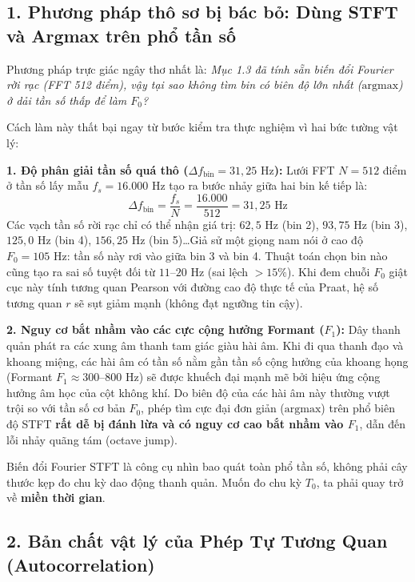 \documentclass[11pt,a4paper]{article}
\begin{document}
\subsection*{1. Phương pháp thô sơ bị bác bỏ: Dùng STFT và Argmax trên phổ tần số}

Phương pháp trực giác ngây thơ nhất là: \textit{Mục 1.3 đã tính sẵn biến đổi Fourier rời rạc (FFT 512 điểm), vậy tại sao không tìm bin có biên độ lớn nhất ($\text{argmax}$) ở dải tần số thấp để làm $F_0$?}

Cách làm này thất bại ngay từ bước kiểm tra thực nghiệm vì hai bức tường vật lý:

\textbf{1. Độ phân giải tần số quá thô ($\Delta f_{\text{bin}} = 31{,}25\text{ Hz}$):}
Lưới FFT $N = 512$ điểm ở tần số lấy mẫu $f_s = 16.000\text{ Hz}$ tạo ra bước nhảy giữa hai bin kế tiếp là:
\[
\Delta f_{\text{bin}} = \frac{f_s}{N} = \frac{16.000}{512} = 31{,}25\text{ Hz}
\]
Các vạch tần số rời rạc chỉ có thể nhận giá trị: $62{,}5\text{ Hz}$ (bin 2), $93{,}75\text{ Hz}$ (bin 3), $125{,}0\text{ Hz}$ (bin 4), $156{,}25\text{ Hz}$ (bin 5)\dots Giả sử một giọng nam nói ở cao độ $F_0 = 105\text{ Hz}$: tần số này rơi vào giữa bin 3 và bin 4. Thuật toán chọn bin nào cũng tạo ra sai số tuyệt đối từ $11\text{--}20\text{ Hz}$ (sai lệch $> 15\%$). Khi đem chuỗi $F_0$ giật cục này tính tương quan Pearson với đường cao độ thực tế của Praat, hệ số tương quan $r$ sẽ sụt giảm mạnh (không đạt ngưỡng tin cậy).

\textbf{2. Nguy cơ bắt nhầm vào các cực cộng hưởng Formant ($F_1$):}
Dây thanh quản phát ra các xung âm thanh tam giác giàu hài âm. Khi đi qua thanh đạo và khoang miệng, các hài âm có tần số nằm gần tần số cộng hưởng của khoang họng (Formant $F_1 \approx 300\text{--}800\text{ Hz}$) sẽ được khuếch đại mạnh mẽ bởi hiệu ứng cộng hưởng âm học của cột không khí. Do biên độ của các hài âm này thường vượt trội so với tần số cơ bản $F_0$, phép tìm cực đại đơn giản ($\text{argmax}$) trên phổ biên độ STFT \textbf{rất dễ bị đánh lừa và có nguy cơ cao bắt nhầm vào $F_1$}, dẫn đến lỗi nhảy quãng tám (octave jump).

\begin{physicalinsight}
Biến đổi Fourier STFT là công cụ nhìn bao quát toàn phổ tần số, không phải cây thước kẹp đo chu kỳ dao động thanh quản. Muốn đo chu kỳ $T_0$, ta phải quay trở về \textbf{miền thời gian}.
\end{physicalinsight}

\subsection*{2. Bản chất vật lý của Phép Tự Tương Quan (Autocorrelation)}
\end{document}
